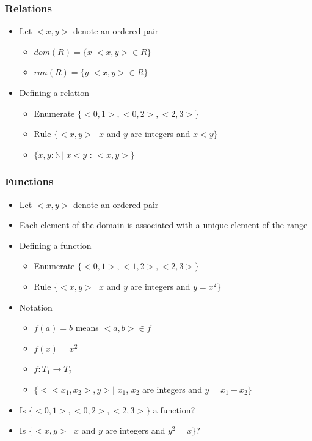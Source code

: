 \documentclass[t,12pt,numbers,fleqn]{beamer}
\begin{document}

\begin{frame}
\frametitle{Relations}
\begin{itemize}
\item Let $<x, y>$ denote an ordered pair
\begin{itemize}
\item $dom(R) = \{x | <x, y> \in R\}$
\item $ran(R) = \{y | <x, y> \in R\}$
\end{itemize}
\item Defining a relation
\begin{itemize}
\item Enumerate $\{ <0, 1>, <0, 2>, <2, 3> \}$
\item Rule $\{ <x, y>|$ $x$ and $y$ are integers and $x < y \}$
\item $\{ x, y: \mathbb{N} |$ $x < y$ : $<x, y> \}$
\end{itemize}
\end{itemize}
\end{frame}


\begin{frame}
\frametitle{Functions}
\begin{itemize}
\item Let $<x, y>$ denote an ordered pair
\item Each element of the domain is associated with a unique element
  of the range
\item Defining a function
\begin{itemize}
\item Enumerate $\{ <0, 1>, <1, 2>, <2, 3> \}$
\item Rule $\{ <x, y> |$ $x$ and $y$ are integers and $y = x^2 \}$
\end{itemize}
\item Notation
\begin{itemize}
\item $f(a) = b$ means $<a, b> \in f$
\item $f(x) = x^2$
\item $f: T_1 \rightarrow T_2$
\item $\{ <<x_1, x_2>, y> |$ $x_1$, $x_2$ are integers and $y = x_1 + x_2 \}$
\end{itemize}
\item Is $\{ <0, 1>, <0, 2>, <2, 3> \}$ a function?
\item Is $\{ <x, y> |$ $x$ and $y$ are integers and $y^2 = x\}$?
\end{itemize}
\end{frame}
\end{document}
